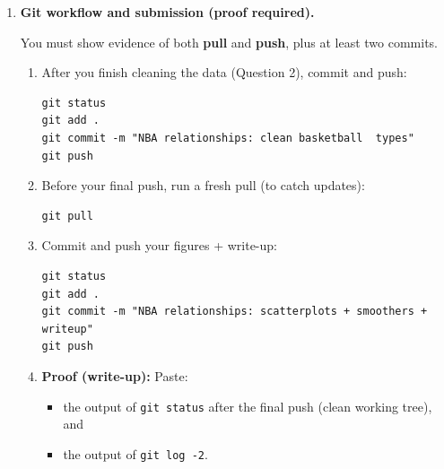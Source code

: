 \documentclass[11pt]{article}
\begin{document}
\begin{enumerate}
  In \texttt{outputs/writeup.md}, write 12--16 sentences addressing:
  \begin{itemize}
    \item For each figure, what is the main pattern (direction + strength + shape)?
    \item Name one outlier or ``surprising'' point pattern and what it could imply (without claiming causality).
    \item Name one concrete plotting choice you made (alpha, axis formatting, legend placement, polynomial fit) and why it helped interpretability.
  \end{itemize}

  \item \textbf{Git workflow and submission (proof required).}

  You must show evidence of both \textbf{pull} and \textbf{push}, plus at least two commits.

  \begin{enumerate}
    \item After you finish cleaning the data (Question 2), commit and push:
\begin{verbatim}
git status
git add .
git commit -m "NBA relationships: clean basketball  types"
git push
\end{verbatim}

    \item Before your final push, run a fresh pull (to catch updates):
\begin{verbatim}
git pull
\end{verbatim}

    \item Commit and push your figures + write-up:
\begin{verbatim}
git status
git add .
git commit -m "NBA relationships: scatterplots + smoothers + writeup"
git push
\end{verbatim}

    \item \textbf{Proof (write-up):} Paste:
    \begin{itemize}
      \item the output of \texttt{git status} after the final push (clean working tree), and
      \item the output of \texttt{git log -2}.
    \end{itemize}
  \end{enumerate}

\end{enumerate}
\end{document}

